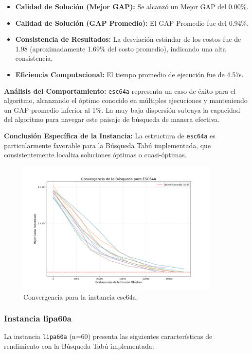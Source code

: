 \documentclass[12pt, a4paper]{article}
\begin{document}
\begin{itemize}
    \item \textbf{Calidad de Solución (Mejor GAP):} Se alcanzó un Mejor GAP del 0.00\%.
    \item \textbf{Calidad de Solución (GAP Promedio):} El GAP Promedio fue del 0.94\%.
    \item \textbf{Consistencia de Resultados:} La desviación estándar de los costos fue de 1.98 (aproximadamente 1.69\% del costo promedio), indicando una alta consistencia.
    \item \textbf{Eficiencia Computacional:} El tiempo promedio de ejecución fue de 4.57s.
\end{itemize}

\textbf{Análisis del Comportamiento:}
\texttt{esc64a} representa un caso de éxito para el algoritmo, alcanzando el óptimo conocido en múltiples ejecuciones y manteniendo un GAP promedio inferior al 1\%. La muy baja dispersión subraya la capacidad del algoritmo para navegar este paisaje de búsqueda de manera efectiva.

\textbf{Conclusión Específica de la Instancia:}
La estructura de \texttt{esc64a} es particularmente favorable para la Búsqueda Tabú implementada, que consistentemente localiza soluciones óptimas o cuasi-óptimas.
\begin{figure}[H]
\centering
\includegraphics[width=0.9\textwidth]{../results/graphs/esc64a_convergence.png}
\caption{Convergencia para la instancia esc64a.}
\label{fig:esc64a_conv}
\end{figure}

\newpage
\subsubsection{Instancia lipa60a}
La instancia \texttt{lipa60a} (n=60) presenta las siguientes características de rendimiento con la Búsqueda Tabú implementada:
\end{document}
